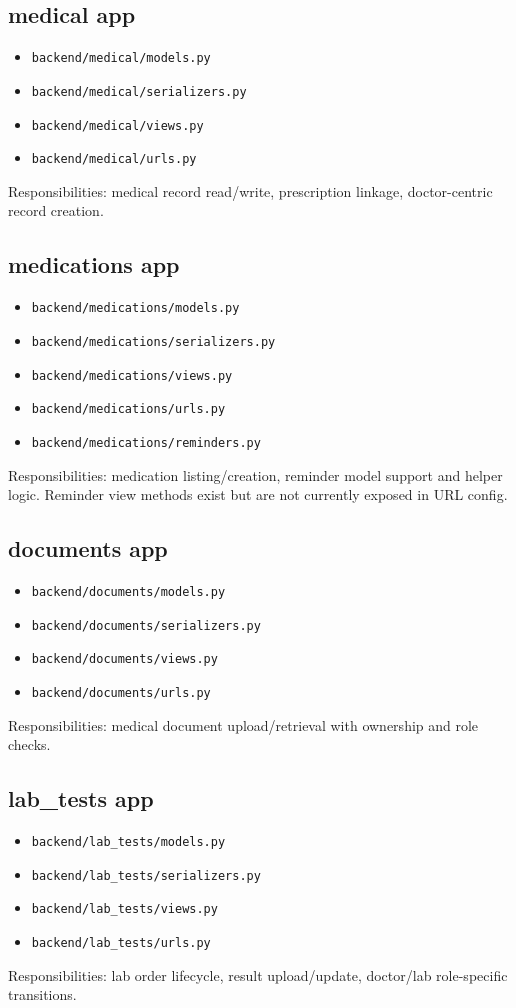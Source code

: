 \documentclass[12pt,a4paper]{article}
\begin{document}
\subsection{medical app}
\begin{itemize}
  \item \texttt{backend/medical/models.py}
  \item \texttt{backend/medical/serializers.py}
  \item \texttt{backend/medical/views.py}
  \item \texttt{backend/medical/urls.py}
\end{itemize}
Responsibilities: medical record read/write, prescription linkage, doctor-centric record creation.

\subsection{medications app}
\begin{itemize}
  \item \texttt{backend/medications/models.py}
  \item \texttt{backend/medications/serializers.py}
  \item \texttt{backend/medications/views.py}
  \item \texttt{backend/medications/urls.py}
  \item \texttt{backend/medications/reminders.py}
\end{itemize}
Responsibilities: medication listing/creation, reminder model support and helper logic. Reminder view methods exist but are not currently exposed in URL config.

\subsection{documents app}
\begin{itemize}
  \item \texttt{backend/documents/models.py}
  \item \texttt{backend/documents/serializers.py}
  \item \texttt{backend/documents/views.py}
  \item \texttt{backend/documents/urls.py}
\end{itemize}
Responsibilities: medical document upload/retrieval with ownership and role checks.

\subsection{lab\_tests app}
\begin{itemize}
  \item \texttt{backend/lab\_tests/models.py}
  \item \texttt{backend/lab\_tests/serializers.py}
  \item \texttt{backend/lab\_tests/views.py}
  \item \texttt{backend/lab\_tests/urls.py}
\end{itemize}
Responsibilities: lab order lifecycle, result upload/update, doctor/lab role-specific transitions.
\end{document}
